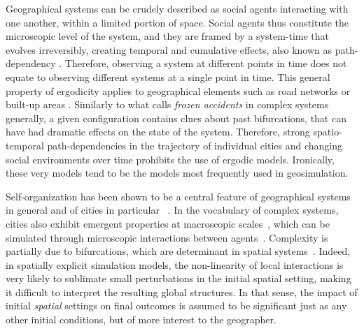 \documentclass{JASSS}
\begin{document}
Geographical systems can be crudely described as social agents interacting with one another, within a limited portion of space. Social agents thus constitute the microscopic level of the system, and they are framed by a system-time that evolves irreversibly, creating temporal and cumulative effects, also known as path-dependency \citep{arthur1994increasing}. Therefore, observing a system at different points in time does not equate to observing different systems at a single point in time. This general property of ergodicity applies to geographical elements such as road networks or built-up areas \citep{pumain2003approche}. Similarly to what \citet{gell1995quark} calls \emph{frozen accidents} in complex systems generally, a given configuration contains clues about past bifurcations, that can have had dramatic effects on the state of the system. Therefore, strong spatio-temporal path-dependencies in the trajectory of individual cities and changing social environments over time prohibits the use of ergodic models. Ironically, these very models tend to be the models most frequently used in geosimulation.


Self-organization has been shown to be a central feature of geographical systems in general and of cities in particular ~\citep{AllenSanglier1981,saint1989villes, Portugali2000}. In the vocabulary of complex systems, cities also exhibit emergent properties at macroscopic scales~\citep{pumain2006hierarchy, AzizAlaouiBertelle2009}, which can be simulated through microscopic interactions between agents~\citep{Wu2002, Batty2007}. Complexity is partially due to bifurcations, which are determinant in spatial systems~\citep{Wilson1981, Wilson2002}. Indeed, in spatially explicit simulation models, the non-linearity of local interactions is very likely to sublimate small perturbations in the initial spatial setting, making it difficult to interpret the resulting global structures. In that sense, the impact of initial \emph{spatial} settings on final outcomes is assumed to be significant just as any other initial conditions, but of more interest to the geographer. \\
\end{document}
